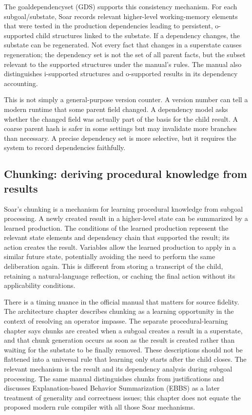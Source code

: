 The \gls{goaldependencyset} (GDS) supports this consistency mechanism. For each subgoal/substate, Soar records relevant higher-level working-memory elements that were tested in the production dependencies leading to persistent, o-supported child structures linked to the substate. If a dependency changes, the substate can be regenerated. Not every fact that changes in a superstate causes regeneration; the dependency set is not the set of all parent facts, but the subset relevant to the supported structures under the manual's rules. The manual also distinguishes i-supported structures and o-supported results in its dependency accounting.\autocite{soar2025architecture}

This is not simply a general-purpose version counter. A version number can tell a modern runtime that some parent field changed. A dependency model asks whether the changed field was actually part of the basis for the child result. A coarse parent hash is safer in some settings but may invalidate more branches than necessary. A precise dependency set is more selective, but it requires the system to record dependencies faithfully.

\subsection{Chunking: deriving procedural knowledge from results}
\label{subsec:ch13-chunking}

Soar's \gls{chunking} is a mechanism for learning procedural knowledge from subgoal processing. A newly created result in a higher-level state can be summarized by a learned production. The conditions of the learned production represent the relevant state elements and dependency chain that supported the result; its action creates the result. Variables allow the learned production to apply in a similar future state, potentially avoiding the need to perform the same deliberation again. This is different from storing a transcript of the child, retaining a natural-language reflection, or caching the final action without its applicability conditions.\autocite{soar2025architecture,soar2025procedural}

There is a timing nuance in the official manual that matters for source fidelity. The architecture chapter describes chunking as a learning opportunity in the context of resolving an operator impasse. The separate procedural-learning chapter says chunks are created when a subgoal creates a result in a superstate, and that chunk generation occurs as soon as the result is created rather than waiting for the substate to be finally removed. These descriptions should not be flattened into a universal rule that learning only starts after the child closes. The relevant mechanism is the result and its dependency analysis during subgoal processing. The same manual distinguishes chunks from justifications and discusses Explanation-based Behavior Summarization (EBBS) as a later treatment of generality and correctness issues; this chapter does not equate the proposed modern rule compiler with all those Soar mechanisms.\autocite{soar2025architecture,soar2025procedural}

